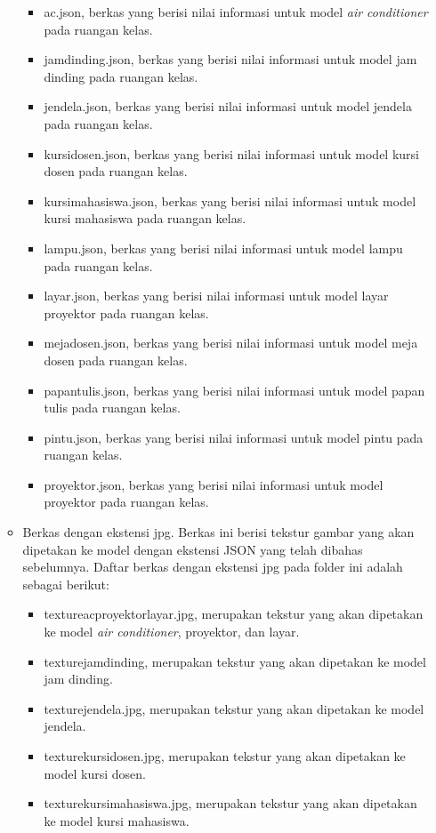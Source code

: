 \begin{itemize}
\begin{itemize}
		\begin{itemize}
			\item ac.json, berkas yang berisi nilai informasi untuk model {\it air conditioner} pada ruangan kelas.
			\item jamdinding.json, berkas yang berisi nilai informasi untuk model jam dinding pada ruangan kelas.
			\item jendela.json, berkas yang berisi nilai informasi untuk model jendela pada ruangan kelas.
			\item kursidosen.json, berkas yang berisi nilai informasi untuk model kursi dosen pada ruangan kelas.
			\item kursimahasiswa.json, berkas yang berisi nilai informasi untuk model kursi mahasiswa pada ruangan kelas.
			\item lampu.json, berkas yang berisi nilai informasi untuk model lampu pada ruangan kelas.
			\item layar.json, berkas yang berisi nilai informasi untuk model layar proyektor pada ruangan kelas.
			\item mejadosen.json, berkas yang berisi nilai informasi untuk model meja dosen pada ruangan kelas.
			\item papantulis.json, berkas yang berisi nilai informasi untuk model papan tulis pada ruangan kelas.
			\item pintu.json, berkas yang berisi nilai informasi untuk model pintu pada ruangan kelas.
			\item proyektor.json, berkas yang berisi nilai informasi untuk model proyektor pada ruangan kelas.
		\end{itemize}
		\item Berkas dengan ekstensi jpg. Berkas ini berisi tekstur gambar yang akan dipetakan ke model dengan ekstensi JSON yang telah dibahas sebelumnya. Daftar berkas dengan ekstensi jpg pada folder ini adalah sebagai berikut:
		\begin{itemize}
			\item textureacproyektorlayar.jpg, merupakan tekstur yang akan dipetakan ke model {\it air conditioner}, proyektor, dan layar.
			\item texturejamdinding, merupakan tekstur yang akan dipetakan ke model jam dinding.
			\item texturejendela.jpg, merupakan tekstur yang akan dipetakan ke model jendela.
			\item texturekursidosen.jpg, merupakan tekstur yang akan dipetakan ke model kursi dosen.
			\item texturekursimahasiswa.jpg, merupakan tekstur yang akan dipetakan ke model kursi mahasiswa.

\end{itemize}
\end{itemize}
\end{itemize}
